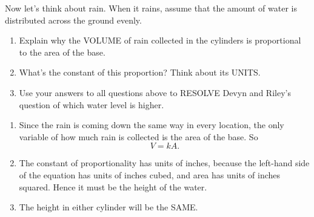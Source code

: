 \documentclass[nooutcomes,noauthor,hints]{ximera}
\begin{document}
\begin{question}
  Now let's think about rain. When it rains, assume that the amount of
  water is distributed across the ground evenly.
  \begin{enumerate}
  \item Explain why the VOLUME of rain collected in the cylinders is
    proportional to the area of the base.
  \item What's the constant of this proportion? Think about its UNITS.
  \item Use your answers to all questions above to RESOLVE Devyn and
    Riley's question of which water level is higher.
  \end{enumerate}
  \begin{freeResponse}
    \begin{enumerate}
    \item Since the rain is coming down the same way in every
      location, the only variable of how much rain is collected is the
      area of the base. So
      \[
      V= k A.
      \]
    \item The constant of proportionality has units of inches, because
      the left-hand side of the equation has units of inches cubed,
      and area has units of inches squared. Hence it must be the height
      of the water.
    \item The height in either cylinder will be the SAME. 
    \end{enumerate}
  \end{freeResponse}
\end{question}
\mynewpage
\end{document}

